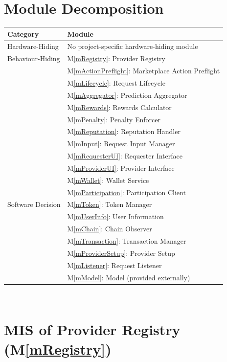 \documentclass[12pt, titlepage]{article}
\newcommand{\mref}[1]{M\ref{#1}}
\begin{document}
\section{Module Decomposition}
\begin{table}[ht!]
\centering
\label{TblMH}
\small
\begin{tabularx}{\textwidth}{p{}X}
\toprule
\textbf{Category} & \textbf{Module}\\
\midrule
Hardware-Hiding & No project-specific hardware-hiding module \\
\midrule
Behaviour-Hiding & \mref{mRegistry}: Provider Registry \\
& \mref{mActionPreflight}: Marketplace Action Preflight \\
& \mref{mLifecycle}: Request Lifecycle \\
& \mref{mAggregator}: Prediction Aggregator \\
& \mref{mRewards}: Rewards Calculator \\
& \mref{mPenalty}: Penalty Enforcer \\
& \mref{mReputation}: Reputation Handler \\
& \mref{mInput}: Request Input Manager \\
& \mref{mRequesterUI}: Requester Interface \\
& \mref{mProviderUI}: Provider Interface \\
& \mref{mWallet}: Wallet Service \\
& \mref{mParticipation}: Participation Client \\
\midrule
Software Decision & \mref{mToken}: Token Manager \\
& \mref{mUserInfo}: User Information \\
& \mref{mChain}: Chain Observer \\
& \mref{mTransaction}: Transaction Manager \\
& \mref{mProviderSetup}: Provider Setup \\
& \mref{mListener}: Request Listener \\
& \mref{mModel}: Model (provided externally) \\
\bottomrule
\end{tabularx}
\end{table}
~\newpage

\section{MIS of Provider Registry (\mref{mRegistry})} \label{misRegistry}
\end{document}
